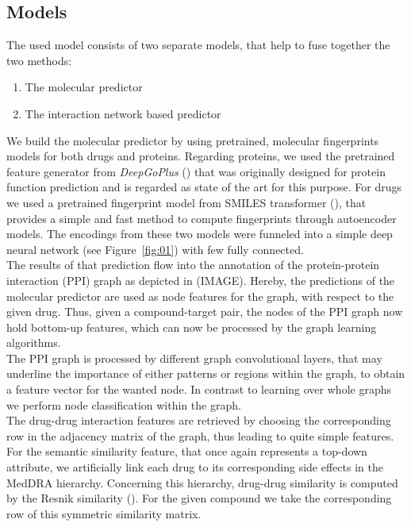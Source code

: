 \documentclass{bioinfo}
\begin{document}
\subsection{Models}
The used model consists of two separate models, that help to fuse together the two methods:
\begin{enumerate}
	\item The molecular predictor
	\item The interaction network based predictor
\end{enumerate}
We build the molecular predictor by using pretrained, molecular fingerprints models for both drugs and proteins. Regarding proteins, we used the pretrained feature generator from \textit{DeepGoPlus} (\citep{DeepGoPlus}) that was originally designed for protein function prediction and is regarded as state of the art for this purpose. For drugs we used a pretrained fingerprint model from SMILES transformer (\cite{SmilesTransformer}), that provides a simple and fast method to compute fingerprints through autoencoder models. The encodings from these two models were funneled into a simple deep neural network (see Figure~\ref{fig:01}) with few fully connected. \\
The results of that prediction flow into the annotation of the protein-protein interaction (PPI) graph as depicted in (IMAGE). Hereby, the predictions of the molecular predictor are used as node features for the graph, with respect to the given drug. Thus, given a compound-target pair, the nodes of the PPI graph now hold bottom-up features, which can now be processed by the graph learning algorithms. \\
The PPI graph is processed by different graph convolutional layers, that may underline the importance of either patterns or regions within the graph, to obtain a feature vector for the wanted node. In contrast to learning over whole graphs we perform node classification within the graph. \\
The drug-drug interaction features are retrieved by choosing the corresponding row in the adjacency matrix of the graph, thus leading to quite simple features. \\
For the semantic similarity feature, that once again represents a top-down attribute, we artificially link each drug to its corresponding side effects in the MedDRA hierarchy. Concerning this hierarchy, drug-drug similarity is computed by the Resnik similarity (\cite{Resnik1995}). For the given compound we take the corresponding row of this symmetric similarity matrix. \\
\end{document}

